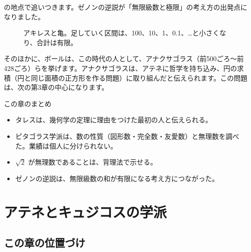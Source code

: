 \documentclass[a4paper,11pt,openany]{ltjsbook}
\begin{document}
の地点で追いつきます。ゼノンの逆説が「無限級数と極限」の考え方の出発点になりました。

\begin{figure}[htbp]
\centering
{}
\caption{アキレスと亀。足していく区間は、100、10、1、0.1、…と小さくなり、合計は有限。}
\end{figure}

そのほかに、ボールは、この時代の人として、アナクサゴラス（前500ごろ〜前428ごろ）らを挙げます。アナクサゴラスは、アテネに哲学を持ち込み、円の求積（円と同じ面積の正方形を作る問題）に取り組んだと伝えられます。この問題は、次の第3章の中心になります。

\begin{pointbox}{この章のまとめ}
\begin{itemize}[leftmargin=*]
\item タレスは、幾何学の定理に理由をつけた最初の人と伝えられる。
\item ピタゴラス学派は、数の性質（図形数・完全数・友愛数）と無理数を調べた。業績は個人に分けられない。
\item $\sqrt2$ が無理数であることは、背理法で示せる。
\item ゼノンの逆説は、無限級数の和が有限になる考え方につながった。
\end{itemize}
\end{pointbox}

\chapter{アテネとキュジコスの学派}

\section{この章の位置づけ}
\end{document}
